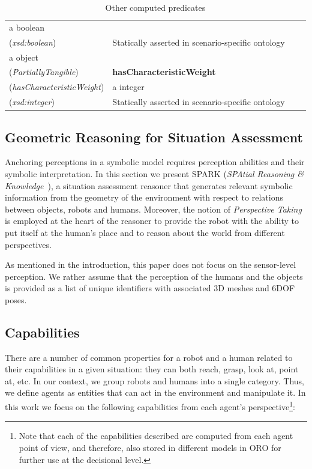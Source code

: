 \documentclass{svmult}
\begin{document}
\begin{table}[h]
\begin{tabular}{p{3cm}p{6cm}p{3cm}l}
 a boolean
\\ (\emph{xsd:boolean})  & 

Statically asserted in scenario-specific ontology  \\ 


 a object
\\ (\emph{PartiallyTangible})  & 

\textbf{hasCharacteristicWeight}
\\ (\emph{hasCharacteristicWeight})  & 

 a integer
\\ (\emph{xsd:integer})  & 

Statically asserted in scenario-specific ontology 
	\end{tabular}
	\caption{Other computed predicates}
\end{table}


\subsection{Geometric Reasoning for Situation Assessment}
\label{spark}


Anchoring perceptions in a symbolic model requires perception abilities
and their symbolic interpretation. In this section we present
SPARK (\emph{SPAtial Reasoning \& Knowledge}~\cite{Sisbot2011}), a situation assessment reasoner
that generates relevant symbolic information from the geometry of the
environment with respect to relations between objects, robots and humans.
Moreover, the notion of \emph{Perspective
Taking}~\cite{Flavell1992,Tversky1999} is employed at the heart of the
reasoner to provide the robot with the ability to put itself at the human's
place and to reason about the world from different perspectives.

As mentioned in the introduction, this paper does not focus on the sensor-level
perception. We rather assume that the perception of the humans and the objects
is provided as a list of unique identifiers with associated 3D meshes and 6DOF
poses.

\subsection{Capabilities}

There are a number of common properties for a robot and a human related to
their capabilities in a given situation: they can both reach, grasp, look at,
point at, etc. In our context, we group robots and humans into a single category.
Thus, we define agents as entities that can act in the environment and
manipulate it. In this work we focus on the following capabilities from each
agent's perspective\footnote{Note that each of the capabilities described are
computed from each agent point of view, and therefore, also stored in different
models in ORO for further use at the decisional level.}:
\end{document}
